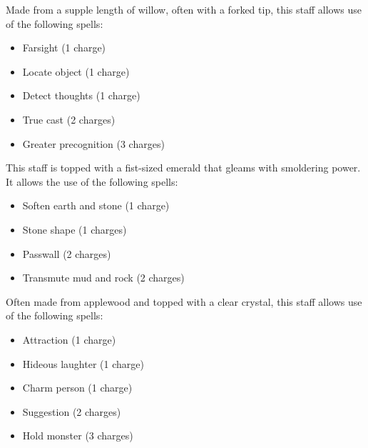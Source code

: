 
 Made from a supple length of willow, often with a forked tip, this staff allows use of the following spells:
\begin{itemize}
\item Farsight (1 charge)
\item Locate object (1 charge)
\item Detect thoughts (1 charge)
\item True cast (2 charges)
\item Greater precognition (3 charges)
\end{itemize}


 This staff is topped with a fist-sized emerald that gleams with smoldering power. It allows the use of the following spells:
\begin{itemize}
\item Soften earth and stone (1 charge)
\item Stone shape (1 charges)
\item Passwall (2 charges)
\item Transmute mud and rock (2 charges)
\end{itemize}


 Often made from applewood and topped with a clear crystal, this staff allows use of the following spells:
\begin{itemize}
\item Attraction (1 charge)
\item Hideous laughter (1 charge)
\item Charm person (1 charge)
\item Suggestion (2 charges)
\item Hold monster (3 charges)
\end{itemize}


